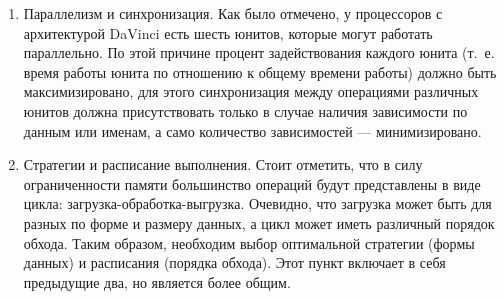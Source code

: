 \begin{enumerate}
    \item Параллелизм и синхронизация. Как было отмечено, у процессоров с
          архитектурой DaVinci есть шесть юнитов, которые могут работать
          параллельно. По этой причине процент задействования каждого юнита
          (т.~е. время работы юнита по отношению к общему времени работы)
          должно быть максимизировано, для этого синхронизация между операциями
          различных юнитов должна присутствовать только в случае наличия
          зависимости по данным или именам, а само количество зависимостей ---
          минимизировано.

    \item Стратегии и расписание выполнения. Стоит отметить, что в силу
          ограниченности памяти большинство операций будут представлены в виде
          цикла: загрузка-обработка-выгрузка. Очевидно, что загрузка может быть
          для разных по форме и размеру данных, а цикл может иметь различный
          порядок обхода. Таким образом, необходим выбор оптимальной стратегии
          (формы данных) и расписания (порядка обхода). Этот пункт включает
          в себя предыдущие два, но является более общим.
\end{enumerate}
